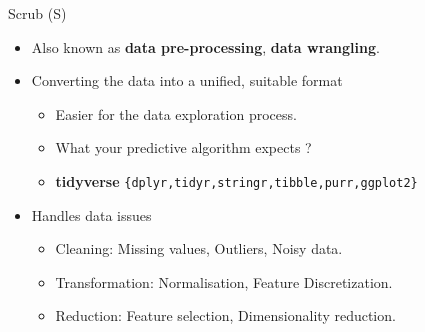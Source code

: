 \documentclass[12pt,ignorenonframetext,]{beamer}
\providecommand{\tightlist}{%
  \setlength{\itemsep}{0pt}\setlength{\parskip}{0pt}}
\begin{document}
\begin{frame}{Scrub (S)}
\protect\hypertarget{scrub-s}{}

\begin{itemize}
\tightlist
\item
  Also known as \textbf{data pre-processing}, \textbf{data wrangling}.\\
  \vspace{2mm}
\item
  Converting the data into a unified, suitable format

  \begin{itemize}
      \item Easier for the data exploration process.
      \item What your predictive algorithm expects ?
      \item \textbf{tidyverse} \texttt{\{dplyr,tidyr,stringr,tibble,purr,ggplot2\}}
  \end{itemize}
   \vspace{2mm}
\item
  Handles data issues

  \begin{itemize}
      \item Cleaning: Missing values, Outliers, Noisy data.
      \item Transformation: Normalisation, Feature Discretization.
      \item Reduction: Feature selection, Dimensionality reduction.
  \end{itemize}
\end{itemize}

\end{frame}
\end{document}
